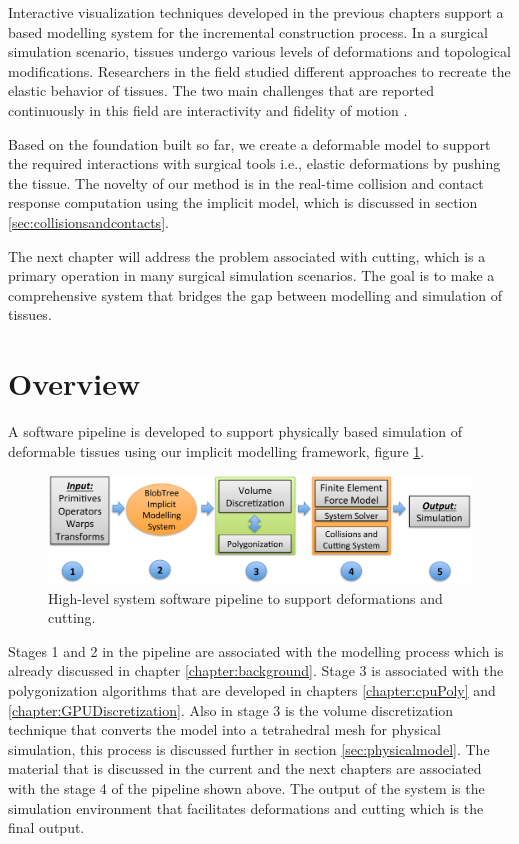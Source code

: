 \label{chapter:deformablemodel}
Interactive visualization techniques developed in the previous chapters support a \blob based modelling 
system for the incremental construction process. In a surgical simulation scenario, tissues undergo 
various levels of deformations and topological modifications. Researchers in the field studied different 
approaches to recreate the elastic behavior of tissues. The two main challenges that are reported 
continuously in this field are interactivity and fidelity of motion \cite{Meier2005}. 

Based on the foundation built so far, we create a deformable model to support the required interactions 
with surgical tools i.e., elastic deformations by pushing the tissue. The 
novelty of our method is in the real-time collision and contact response computation using the implicit 
model, which is discussed in section \ref{sec:collisionsandcontacts}.

The next chapter will address the problem associated with cutting, which is a primary operation in 
many surgical simulation scenarios. The goal is to make a comprehensive system that bridges the gap 
between modelling and simulation of tissues. 

\section{Overview}
A software pipeline is developed to support physically based simulation of deformable tissues using our 
implicit modelling framework, figure \ref{fig:systempipeline}. 

\begin{figure}[H]
  \centering
  \includegraphics[width=1.0\linewidth]{figures/deformable/pipeline.pdf}
  \caption{\label{fig:systempipeline}
  {High-level system software pipeline to support deformations and cutting. }
}
\end{figure}

Stages 1 and 2 in the pipeline are associated with the modelling process which is 
already discussed in chapter \ref{chapter:background}. Stage 3 is 
associated with the polygonization algorithms that are developed in chapters \ref{chapter:cpuPoly} 
and \ref{chapter:GPUDiscretization}. Also in stage 3 is the volume discretization technique that converts 
the \blob model into a tetrahedral mesh for physical simulation, this process is discussed further in 
section \ref{sec:physicalmodel}. The material that is discussed in the current and the next chapters are associated with the 
stage 4 of the pipeline shown above. The output of the system is the simulation environment that 
facilitates deformations and cutting which is the final output. 


